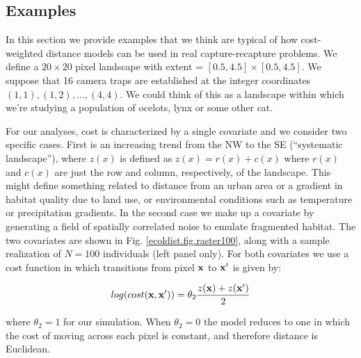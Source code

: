 \documentclass[12pt]{article}
\begin{document}
\begin{spacing}{1.8}
\section{Examples}

In this section we provide examples that we think are typical of how
cost-weighted distance models can be used in real capture-recapture
problems.  We define a $20 \times 20$ pixel landscape with
extent = $[0.5, 4.5] \times [0.5, 4.5]$.
We suppose that 16 camera traps are established at the integer coordinates
$(1,1), (1,2), \ldots, (4,4)$. We could think of this as a landscape
within which we're studying a population of ocelots, lynx or some
other cat.

For our analyses, cost is characterized by a single covariate
and we consider two specific cases. First is an increasing trend from
the NW to the SE (``systematic landscape''), where $z(x)$ is defined as
$z(x) = r(x) + c(x)$ where $r(x)$ and $c(x)$ are just the row and
column, respectively, of the landscape.  This might define something
related to distance from an urban area or a gradient in habitat
quality due to land use, or environmental conditions such as
temperature or precipitation gradients.  In the second case we make up
a covariate by generating a field of spatially correlated noise to
emulate fragmented habitat.
The two covariates are shown in Fig. \ref{ecoldist.fig.raster100},
along with a sample realization of
$N=100$ individuals (left panel only).  For both covariates we use a
cost function in which transitions from pixel ${\bf x}$ to ${\bf x}'$
is given by:

\[
 log(cost({\bf x},{\bf x}'))=  \theta_2 \frac{z({\bf x}) + z({\bf x}')}{2}
\]

{\flushleft where} $\theta_2 = 1$ for our simulation.
When $\theta_2=0$ the
model reduces to one in which the cost of moving across each pixel is
constant, and therefore distance is Euclidean.


\end{spacing}
\end{document}
